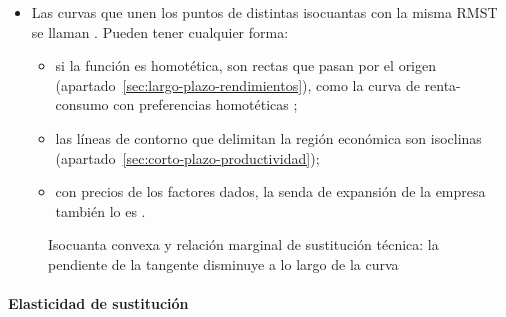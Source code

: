\documentclass[11pt]{article}
\begin{document}
\begin{itemize}
  la cantidad de capital que puede dejar de usarse al emplear una unidad más de trabajo sin que cambie la producción. Equivale al cociente de las productividades marginales.
  \begin{itemize}
  \item Con isocuantas estrictamente convexas, la RMST \emph{disminuye} a lo largo de la isocuanta conforme aumenta $z_L$: cuanto más trabajo y menos capital se usa, menos capital libera una unidad adicional de trabajo.
  \item La RMST mide la sustituibilidad de los factores, pero depende de sus unidades de medida.
  \end{itemize}
\item Las curvas que unen los puntos de distintas isocuantas con la misma RMST se llaman . Pueden tener cualquier forma:
  \begin{itemize}
  \item si la función es homotética, son rectas que pasan por el origen (apartado~\ref{sec:largo-plazo-rendimientos}), como la curva de renta-consumo con preferencias homotéticas ;
  \item las líneas de contorno que delimitan la región económica son isoclinas (apartado~\ref{sec:corto-plazo-productividad});
  \item con precios de los factores dados, la senda de expansión de la empresa también lo es .
  \end{itemize}
\end{itemize}

\begin{figure}[H]
\centering
\caption{Isocuanta convexa y relación marginal de sustitución técnica: la pendiente de la tangente disminuye a lo largo de la curva}\label{fig:isocuantas-rmst}
\end{figure}

\paragraph{Elasticidad de sustitución}
\end{document}
